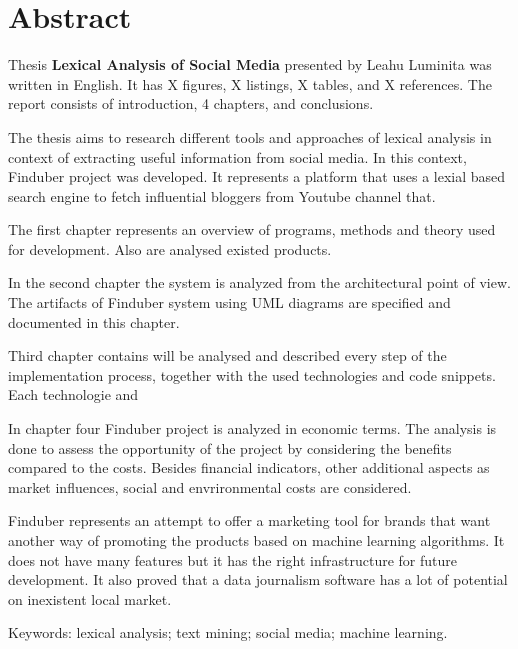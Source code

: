 \section*{Abstract}
Thesis \textbf{Lexical Analysis of Social Media} presented by Leahu Luminita was written in English. It has X figures, X listings, X tables, and X references. The report consists of introduction, 4 chapters, and conclusions.

The thesis aims to research different tools and approaches of lexical analysis in context of extracting useful information from social media. In this context, Finduber project was developed. It represents a platform that uses a lexial based search engine to fetch influential bloggers from Youtube channel that. 

The first chapter represents an overview of programs, methods and theory used for development. Also are analysed existed products.

In the second chapter the system is analyzed from the architectural point of view. The artifacts of Finduber system using UML diagrams are specified and documented in this chapter.

Third chapter contains will be analysed and described every step of the implementation process, together with the used technologies and code snippets. Each technologie and 

In chapter four Finduber project is analyzed in economic terms. The analysis is done to assess the opportunity of the project by considering the benefits compared to the costs. Besides financial indicators, other additional aspects as market influences, social and envrironmental costs are considered. 

Finduber represents an attempt to offer a marketing tool for brands that want another way of promoting the products based on machine learning algorithms. It does not have many features but it has the right infrastructure for future development. It also proved that a data journalism software has a lot of potential on inexistent local market.

Keywords: lexical analysis; text mining; social media; machine learning.